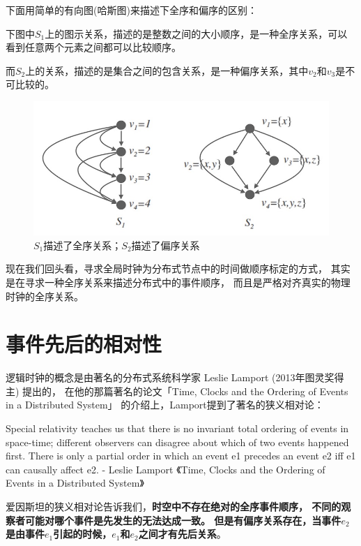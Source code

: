 \documentclass[cn,11pt,chinese]{elegantbook}
\renewenvironment{quote}{\begin{customblockquote}\list{}{\rightmargin=0em\leftmargin=0em}%
\item\relax\color{blockquote-text}\ignorespaces}{\unskip\unskip\endlist\end{customblockquote}}
\begin{document}
下面用简单的有向图(哈斯图)来描述下全序和偏序的区别：

下图中\(S_1\)上的图示关系，描述的是整数之间的大小顺序，是一种全序关系，可以看到任意两个元素之间都可以比较顺序。

而\(S_2\)上的关系，描述的是集合之间的包含关系，是一种偏序关系，其中\(v_2\)和\(v_3\)是不可比较的。

\begin{figure}
\centering
\includegraphics{images/appendix-a-05.jpeg}
\caption{\(S_1\)描述了全序关系；\(S_2\)描述了偏序关系}
\end{figure}

现在我们回头看，寻求全局时钟为分布式节点中的时间做顺序标定的方式，
其实是在寻求一种全序关系来描述分布式中的事件顺序，
而且是严格对齐真实的物理时钟的全序关系。

\hypertarget{ux4e8bux4ef6ux5148ux540eux7684ux76f8ux5bf9ux6027}{%
\section{事件先后的相对性}\label{ux4e8bux4ef6ux5148ux540eux7684ux76f8ux5bf9ux6027}}

逻辑时钟的概念是由著名的分布式系统科学家 Leslie Lamport
(2013年图灵奖得主) 提出的， 在他的那篇著名的论文「Time, Clocks and the
Ordering of Events in a Distributed System」
的介绍上，Lamport提到了著名的狭义相对论：

\begin{quote}
Special relativity teaches us that there is no invariant total ordering
of events in space-time; different observers can disagree about which of
two events happened first. There is only a partial order in which an
event e1 precedes an event e2 iff e1 can causally affect e2. - Leslie
Lamport 《Time, Clocks and the Ordering of Events in a Distributed
System》
\end{quote}

爱因斯坦的狭义相对论告诉我们，\textbf{时空中不存在绝对的全序事件顺序，
不同的观察者可能对哪个事件是先发生的无法达成一致。
但是有偏序关系存在，当事件\(e_2\)是由事件\(e_1\)引起的时候，\(e_1\)和\(e_2\)之间才有先后关系}。
\end{document}
